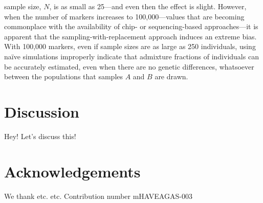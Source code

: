 sample size, $N$, is as small as 25---and even then the effect is slight.  However, when the
number of markers increases to 100,000---values that are becoming commonplace with the availability of chip-
or sequencing-based approaches---it is apparent that the sampling-with-replacement approach
induces an extreme bias.  With 100,000 markers, even if sample sizes are as large as 250 individuals,
using na\"{i}ve simulations improperly indicate that admixture fractions of individuals can be
accurately estimated, even when there are no genetic differences, whatsoever between the populations that
samples $A$ and $B$ are drawn.   
 


\section*{Discussion}
Hey! Let's discuss this!



\section*{Acknowledgements}
We thank etc. etc.   Contribution number  mHAVEAGAS-003